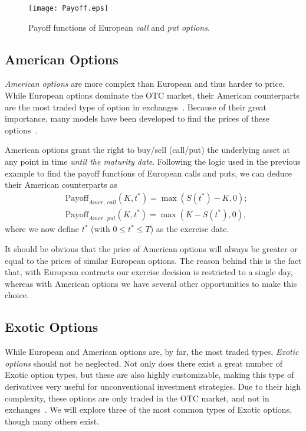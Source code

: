 \begin{figure}[!htb]
    \centering
      \texttt{[image: Payoff.eps]}
      \caption[Payoff functions of European call and put options]{Payoff functions of European \emph{call} and \emph{put options}.}\label{fig:Payoff}
    \end{figure}
    



\subsection{American Options}
\emph{American options} are more complex than European and thus harder to price. While European options dominate the OTC market, their American counterparts are the most traded type of option in exchanges~\cite{InvAmer}. Because of their great importance, many models have been developed to find the prices of these options~\cite{Longstaff}.

American options grant the right to buy/sell (call/put) the underlying asset at any point in time \emph{until the maturity date}. Following the logic used in the previous example to find the payoff functions of European calls and puts, we can deduce their American counterparts as
\begin{equation}
\begin{split}
&\text{Payoff}_{Amer,\ call}(K,t^*)=\max\left(S(t^*)-K,0\right);\\
&\text{Payoff}_{Amer,\ put}(K,t^*)=\max\left(K-S(t^*),0\right),
\end{split}
\end{equation}
\noindent where we now define $t^*$ (with $0\leq t^*\leq T$) as the exercise date.

It should be obvious that the price of American options will always be greater or equal to the prices of similar European options. The reason behind this is the fact that, with European contracts our exercise decision is restricted to a single day, whereas with American options we have several other opportunities to make this choice.


\subsection{Exotic Options}
While European and American options are, by far, the most traded types, \emph{Exotic options} should not be neglected. Not only does there exist a great number of Exotic option types, but these are also highly customizable, making this type of derivatives very useful for unconventional investment strategies. Due to their high complexity, these options are only traded in the OTC market, and not in exchanges~\cite{InvExotic}. We will explore three of the most common types of Exotic options, though many others exist.

